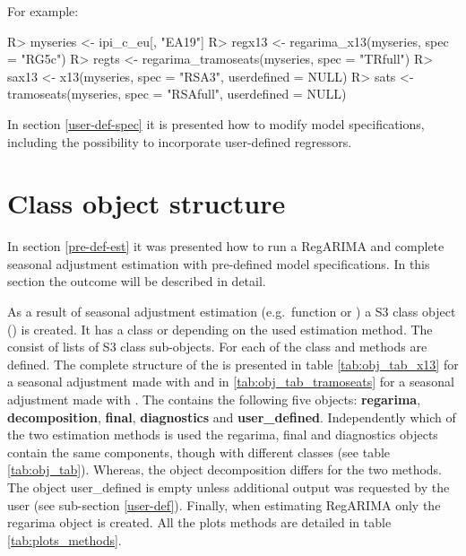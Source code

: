\documentclass[article]{jss}
\begin{document}
For example:

\begin{CodeChunk}

\begin{CodeInput}
R> myseries <- ipi_c_eu[, "EA19"]
R> regx13 <- regarima_x13(myseries, spec = "RG5c")
R> regts <- regarima_tramoseats(myseries, spec = "TRfull")
R> sax13 <- x13(myseries, spec = "RSA3", userdefined = NULL)
R> sats <- tramoseats(myseries, spec = "RSAfull", userdefined = NULL)
\end{CodeInput}
\end{CodeChunk}

In section \ref{user-def-spec} it is presented how to modify model
specifications, including the possibility to incorporate user-defined
regressors.

\hypertarget{sa-obj-struc}{%
\section{Class object structure}\label{sa-obj-struc}}

In section \ref{pre-def-est} it was presented how to run a RegARIMA and
complete seasonal adjustment estimation with pre-defined model
specifications. In this section the outcome will be described in detail.

As a result of seasonal adjustment estimation (e.g.~function 
or ) a S3 class object () is created.
It has a class  or 
depending on the used estimation method. The  consist of
lists of S3 class sub-objects. For each of the class  and
 methods are defined. The complete structure of the
 is presented in table \ref{tab:obj_tab_x13} for a
seasonal adjustment made with  and in
\ref{tab:obj_tab_tramoseats} for a seasonal adjustment made with
. The  contains the following five
objects: \textbf{regarima}, \textbf{decomposition}, \textbf{final},
\textbf{diagnostics} and \textbf{user\_defined}. Independently which of
the two estimation methods is used the regarima, final and diagnostics
objects contain the same components, though with different classes (see
table \ref{tab:obj_tab}). Whereas, the object decomposition differs for
the two methods. The object user\_defined is empty unless additional
output was requested by the user (see sub-section \ref{user-def}).
Finally, when estimating RegARIMA only the regarima object is created.
All the plots methods are detailed in table \ref{tab:plots_methods}.
\end{document}
